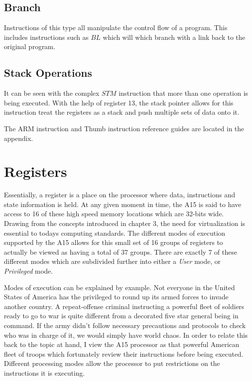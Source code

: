 \documentclass[12pt]{scrreprt}
\begin{document}
	\section{Branch}
		Instructions of this type all manipulate the control flow of a program.
		This includes instructions such as $BL$ which will which branch with a link back to the original program.
	\section{Stack Operations}
		It can be seen with the complex $STM$ instruction that more than one operation is being executed.
		With the help of register 13, the stack pointer allows for this instruction treat the registers as a stack and push multiple sets of data onto it.

	The ARM instruction and Thumb instruction reference guides are located in the appendix.

{\let\clearpage\relax\chapter{Registers}}

	Essentially, a register is a place on the processor where data, instructions and state information is held.
	At any given moment in time, the A15 is said to have access to 16 of these high speed memory locations which are 32-bits wide.
	Drawing from the concepts introduced in chapter 3, the need for virtualization is essential to todays computing standards.
	The different modes of execution supported by the A15 allows for this small set of 16 groups of registers to actually be viewed as having a total of 37 groups.
	There are exactly 7 of these different modes which are subdivided further into either a \textit{User} mode, or \textit{Privileged} mode.
	
	Modes of execution can be explained by example.
	Not everyone in the United States of America has the privileged to round up its armed forces to invade another country.
	A repeat-offense criminal instructing a powerful fleet of soldiers ready to go to war is quite different from a decorated five star general being in command.
	If the army didn't follow necessary precautions and protocols to check who was in charge of it, we would simply have world chaos.
	In order to relate this back to the topic at hand, I view the A15 processor as that powerful American fleet of troops which fortunately review their instructions before being executed.
	Different processing modes allow the processor to put restrictions on the instructions it is executing.
\end{document}
